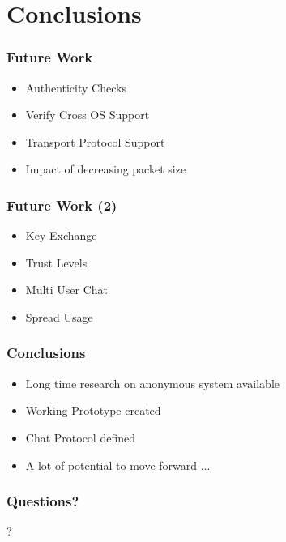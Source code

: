 \documentclass{beamer}
\begin{document}
\section{Conclusions}
\frame
{
  \frametitle{Future Work}
  \begin{itemize}
    \item Authenticity Checks
    \item Verify Cross OS Support
    \item Transport Protocol Support
    \item Impact of decreasing packet size
  \end{itemize}
}


\frame
{
  \frametitle{Future Work (2)}
  \begin{itemize}
    \item Key Exchange
    \item Trust Levels
    \item Multi User Chat
    \item Spread Usage
  \end{itemize}
}

\frame
{
  \frametitle{Conclusions}
  \begin{itemize}
    \item Long time research on anonymous system available
    \item Working Prototype created
    \item Chat Protocol defined
    \item A lot of potential to move forward ...
  \end{itemize}
}

\frame
{
  \frametitle{Questions?}
  \begin{center}
  ?
  \end{center}
}
\end{document}
